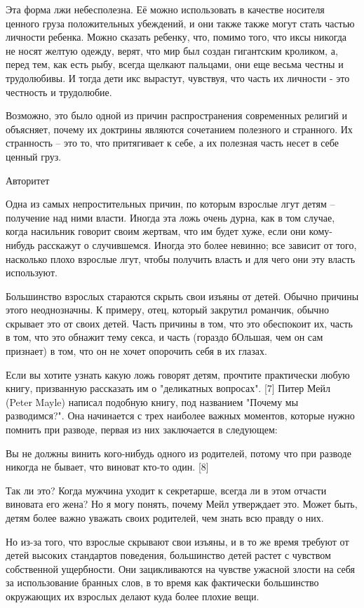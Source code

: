 \documentclass[ebook,12pt,oneside,openany]{memoir}
\begin{document}
Эта форма лжи небесполезна. Её можно использовать в качестве носителя
ценного груза положительных убеждений, и они также также могут стать
частью личности ребенка. Можно сказать ребенку, что, помимо того, что
иксы никогда не носят желтую одежду, верят, что мир был создан
гигантским кроликом, а, перед тем, как есть рыбу, всегда щелкают
пальцами, они еще весьма честны и трудолюбивы. И тогда дети икс
вырастут, чувствуя, что часть их личности - это честность и
трудолюбие.

Возможно, это было одной из причин распространения современных религий
и объясняет, почему их доктрины являются сочетанием полезного и
странного. Их странность -- это то, что притягивает к себе, а их
полезная часть несет в себе ценный груз.

Авторитет

Одна из самых непростительных причин, по которым взрослые лгут детям
-- получение над ними власти. Иногда эта ложь очень дурна, как в том
случае, когда насильник говорит своим жертвам, что им будет хуже, если
они кому-нибудь расскажут о случившемся. Иногда это более невинно; все
зависит от того, насколько плохо взрослые лгут, чтобы получить власть
и для чего они эту власть используют.

Большинство взрослых стараются скрыть свои изъяны от детей. Обычно
причины этого неоднозначны. К примеру, отец, который закрутил
романчик, обычно скрывает это от своих детей. Часть причины в том, что
это обеспокоит их, часть в том, что это обнажит тему секса, и часть
(гораздо бОльшая, чем он сам признает) в том, что он не хочет
опорочить себя в их глазах.

Если вы хотите узнать какую ложь говорят детям, прочтите практически
любую книгу, призванную рассказать им о "деликатных вопросах". [7]
Питер Мейл (Peter Mayle) написал подобную книгу, под названием "Почему
мы разводимся?". Она начинается с трех наиболее важных моментов,
которые нужно помнить при разводе, первая из них заключается в
следующем:

Вы не должны винить кого-нибудь одного из родителей, потому что при
разводе никогда не бывает, что виноват кто-то один. [8]

Так ли это? Когда мужчина уходит к секретарше, всегда ли в этом
отчасти виновата его жена? Но я могу понять, почему Мейл утверждает
это. Может быть, детям более важно уважать своих родителей, чем знать
всю правду о них.

Но из-за того, что взрослые скрывают свои изъяны, и в то же время
требуют от детей высоких стандартов поведения, большинство детей
растет с чувством собственной ущербности. Они зацикливаются на чувстве
ужасной злости на себя за использование бранных слов, в то время как
фактически большинство окружающих их взрослых делают куда более плохие
вещи.
\end{document}
